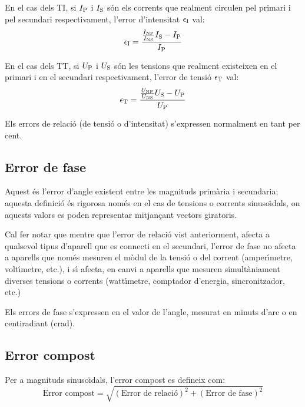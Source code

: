 En el cas dels TI, si $I_\mathrm{P}$ i $I_\mathrm{S}$ s\'{o}n els corrents que
realment circulen pel primari i pel secundari respectivament,
l'error d'intensitat $\epsilon_\mathrm{I}$ val:
\begin{equation}
    \epsilon_\mathrm{I} = \frac{\frac{I_\mathrm{NP}}{I_\mathrm{NS}} I_\mathrm{S} - I_\mathrm{P}} {I_\mathrm{P}}
\end{equation}

En el cas dels TT, si $U_\mathrm{P}$ i $U_\mathrm{S}$ s\'{o}n les tensions que
realment existeixen en el primari i en el secundari respectivament,
l'error de tensi\'{o} $\epsilon_\mathrm{T}$ val:
\begin{equation}
    \epsilon_\mathrm{T} = \frac{\frac{U_\mathrm{NP}}{U_\mathrm{NS}} U_\mathrm{S} - U_\mathrm{P}} {U_\mathrm{P}}
\end{equation}

Els errors de relaci\'{o} (de tensi\'{o} o d'intensitat) s'expressen
normalment en tant per cent.

\subsection{Error de fase}

Aquest \'{e}s l'error d'angle  existent entre les magnituds prim\`{a}ria i
secundaria; aquesta definici\'{o} \'{e}s rigorosa nom\'{e}s en el cas de
tensions o corrents sinuso\"{\i}dals, on aquests valors es poden
representar mitjan\c{c}ant vectors giratoris.

 Cal fer notar que mentre que l'error de relaci\'{o}
vist anteriorment, afecta a qualsevol tipus d'aparell que es
connecti en el secundari, l'error de fase no afecta a aparells que
nom\'{e}s mesuren el m\`{o}dul de la tensi\'{o} o del corrent (amper\'{\i}metre,
volt\'{\i}metre, etc.), i s\'{\i} afecta, en canvi a aparells que mesuren
simult\`{a}niament diverses tensions o corrents (watt\'{\i}metre, comptador
d'energia, sincronitzador, etc.)

Els errors de fase s'expressen en el valor de l'angle, mesurat en
minuts d'arc o en centiradiant (crad).

\subsection{Error compost}

Per a magnituds sinuso\"{\i}dals, l'error compost es defineix com:
\begin{equation}
    \text{Error compost} = \sqrt{(\text{Error de relaci\'{o}})^2 +
    (\text{Error de fase})^2}
\end{equation}

